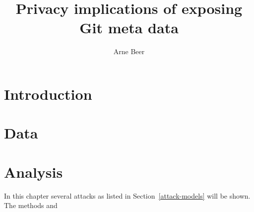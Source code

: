 \documentclass{thesis}
\title{Privacy implications of exposing Git meta data}
\author{Arne Beer}
\begin{document}

\cleardoublepage{}


\clearpage



{\small \tableofcontents}



\chapter{Introduction}




\chapter{Data}






\chapter{Analysis}\label{analysis}
In this chapter several attacks as listed in Section~\ref{attack-models} will be shown. The methods and


\begingroup
    \footnotesize
    \listoffigures
    \let\clearpage\relax
    \listoflistings{}
    \listoftables
\endgroup

\renewcommand*{\bibfont}{\footnotesize}
\printbibliography{}



\end{document}
